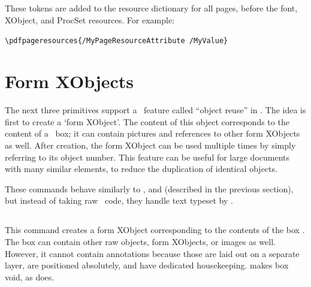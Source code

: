 \documentclass{pdftexmanual}
\begin{document}
\subsection{}

These tokens are added to the resource dictionary for all pages, before
the font, XObject, and ProcSet resources. For example:

\begin{verbatim}
\pdfpageresources{/MyPageResourceAttribute /MyValue}
\end{verbatim}

\section{Form XObjects}

The next three primitives support a \PDF\ feature called ``object
reuse'' in \PDFTEX. The idea is first to create a `form XObject'. The
content of this object corresponds to the content of a \TEX\ box; it can
contain pictures and references to other form XObjects as well. After
creation, the form XObject can be used multiple times by simply
referring to its object number. This feature can be useful for large
documents with many similar elements, to reduce the duplication of
identical objects.

These commands behave similarly to ,  and
 (described in the previous section), but instead of
taking raw \PDF\ code, they handle text typeset by \TEX.

\subsection{}

\noindent{}

This command creates a form XObject corresponding to the contents of the
box . The box can contain other raw objects, form
XObjects, or images as well. However, it cannot contain annotations
because those are laid out on a separate layer, are positioned
absolutely, and have dedicated housekeeping.  makes box
 void, as  does.
\end{document}
